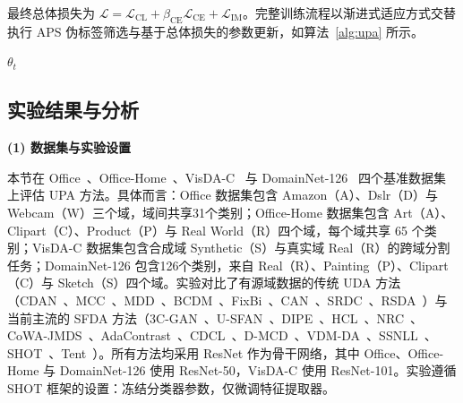 最终总体损失为 $\mathcal{L} = \mathcal{L}_{\text{CL}} + \beta_{\text{CE}} \mathcal{L}_{\text{CE}} + \mathcal{L}_{\text{IM}}$。完整训练流程以渐进式适应方式交替执行 APS 伪标签筛选与基于总体损失的参数更新，如算法~\ref{alg:upa} 所示。

\begin{algorithm}[!htb]
  \label{alg:upa} 
  \small
  \BlankLine
  \Return $\theta_t$
\end{algorithm}

\subsection{实验结果与分析}

\noindent\textbf{(1) 数据集与实验设置}

本节在 Office~\cite{saenko2010adapting}、Office-Home~\cite{venkateswara2017deep}、VisDA-C~\cite{peng2017visda} 与 DomainNet-126~\cite{peng2019moment} 四个基准数据集上评估 UPA 方法。具体而言：Office 数据集包含 Amazon（A）、Dslr（D）与 Webcam（W）三个域，域间共享31个类别；Office-Home 数据集包含 Art（A）、Clipart（C）、Product（P）与 Real World（R）四个域，每个域共享 65 个类别；VisDA-C 数据集包含合成域 Synthetic（S）与真实域 Real（R）的跨域分割任务；DomainNet-126 包含126个类别，来自 Real（R）、Painting（P）、Clipart（C）与 Sketch（S）四个域。实验对比了有源域数据的传统 UDA 方法（CDAN~\cite{CDAN}、MCC~\cite{MCC}、MDD~\cite{MDD}、BCDM~\cite{BCDM}、FixBi~\cite{FIxBi}、CAN~\cite{CAN}、SRDC~\cite{SRDC}、RSDA~\cite{RSDA}）与当前主流的 SFDA 方法（3C-GAN~\cite{3C-GAN}、U-SFAN~\cite{U-SFAN}、DIPE~\cite{DIPE}、HCL~\cite{HCL}、NRC~\cite{yang2021neighbor}、CoWA-JMDS~\cite{cowa}、AdaContrast~\cite{AdaContrast}、CDCL~\cite{wang2022cross}、D-MCD~\cite{chu2022denoised}、VDM-DA~\cite{tian2022vdm}、SSNLL~\cite{chen2022self}、SHOT~\cite{liang2021source}、Tent~\cite{tent}）。所有方法均采用 ResNet 作为骨干网络，其中 Office、Office-Home 与 DomainNet-126 使用 ResNet-50，VisDA-C 使用 ResNet-101。实验遵循 SHOT 框架的设置：冻结分类器参数，仅微调特征提取器。

